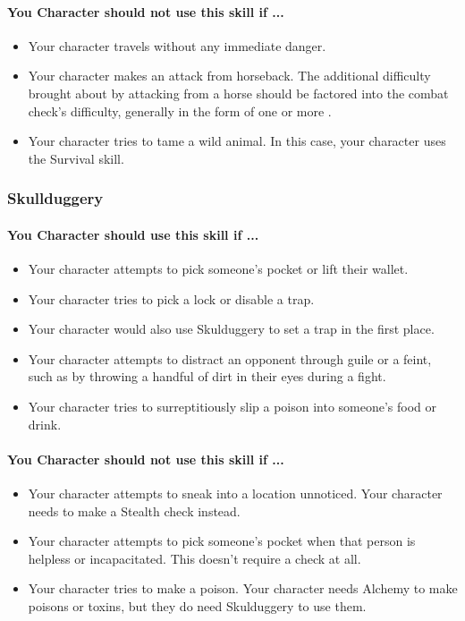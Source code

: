 \begin{multicols}{2}
\paragraph{You Character should not use this skill if ...}
\begin{itemize}
    \item Your character travels without any immediate danger.
    \item Your character makes an attack from horseback. The additional difficulty
        brought about by attacking from a horse should be factored into the combat
        check's difficulty, generally in the form of one or more \difficulty.
    \item Your character tries to tame a wild animal. In this case, your character
        uses the Survival skill.
\end{itemize}

\subsubsection{Skullduggery}\label{skill:skullduggery}
\paragraph{You Character should use this skill if ...}
\begin{itemize}
    \item Your character attempts to pick someone's pocket or lift their wallet.
    \item Your character tries to pick a lock or disable a trap.
    \item Your character would also use Skulduggery to set a trap in the first
        place.
    \item Your character attempts to distract an opponent through guile or a feint,
        such as by throwing a handful of dirt in their eyes during a fight.
    \item Your character tries to surreptitiously slip a poison into someone's
        food or drink.
\end{itemize}
\paragraph{You Character should not use this skill if ...}
\begin{itemize}
    \item Your character attempts to sneak into a location unnoticed. Your
        character needs to make a Stealth check instead.
    \item Your character attempts to pick someone's pocket when that person is
        helpless or incapacitated. This doesn't require a check at all.
    \item Your character tries to make a poison. Your character needs Alchemy to
        make poisons or toxins, but they do need Skulduggery to use them.
\end{itemize}


\end{multicols}
